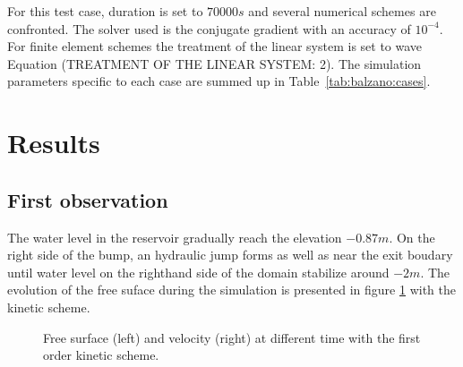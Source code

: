 For this test case, duration is set to $70000 s$ and several numerical schemes
are confronted. The solver used is the conjugate gradient with an accuracy of $10^{-4}$.
For finite element schemes the treatment of the linear system is set to wave Equation (TREATMENT
OF THE LINEAR SYSTEM: 2). The simulation parameters specific to each case are summed up in Table~\ref{tab:balzano:cases}.
\begin{table}[H]
  \caption{List of the simulation parameters used for the five cases.}
  \label{tab:balzano:cases}
\end{table}

%
\section{Results}

\subsection{First observation}
\label{subsection:balzano:observations}

The water level in the reservoir gradually reach the elevation $-0.87m$. On the right side of the bump,
an hydraulic jump forms as well as near the exit boudary until water level on the righthand side of the domain
stabilize around $-2 m$. The evolution of the free suface during the simulation is presented in figure
\ref{fig:balzano:firstobs} with the kinetic scheme.

\begin{figure}[H]
\begin{minipage}[t]{0.5\textwidth}
 \centering
\end{minipage}%
\begin{minipage}[t]{0.5\textwidth}
 \centering
\end{minipage}
  \caption{Free surface (left) and velocity (right) at different time with the first order kinetic scheme.}
  \label{fig:balzano:firstobs}
\end{figure}


